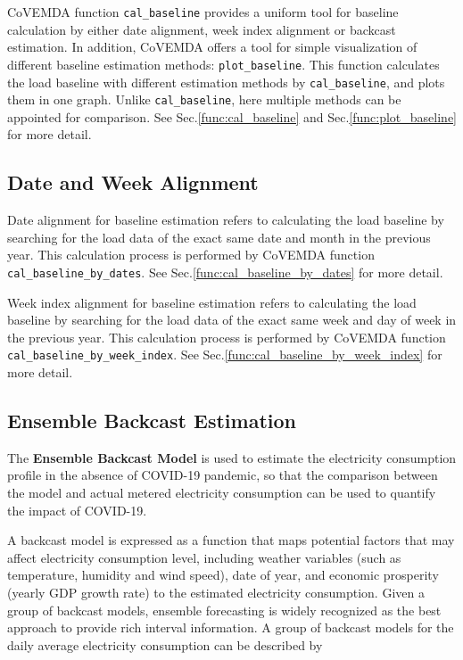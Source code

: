 \documentclass[10pt]{article}
\newcommand{\covemda}{CoVEMDA}
\numberwithin{equation}{section}
\numberwithin{table}{section}
\numberwithin{figure}{section}
\begin{document}
\covemda{} function \verb!cal_baseline! provides a uniform tool for baseline calculation by either date alignment, week index alignment or backcast estimation. In addition, \covemda{} offers a tool for simple visualization of different baseline estimation methods: \verb!plot_baseline!. This function calculates the load baseline with different estimation methods by \verb!cal_baseline!, and plots them in one graph. Unlike \verb!cal_baseline!, here multiple methods can be appointed for comparison. See Sec.\ref{func:cal_baseline} and Sec.\ref{func:plot_baseline} for more detail.



\subsection{Date and Week Alignment}

Date alignment for baseline estimation refers to calculating the load baseline by searching for the load data of the exact same date and month in the previous year. This calculation process is performed by \covemda{} function \verb!cal_baseline_by_dates!. See Sec.\ref{func:cal_baseline_by_dates} for more detail.

Week index alignment for baseline estimation refers to calculating the load baseline by searching for the load data of the exact same week and day of week in the previous year. This calculation process is performed by \covemda{} function \verb!cal_baseline_by_week_index!. See Sec.\ref{func:cal_baseline_by_week_index} for more detail.



\subsection{Ensemble Backcast Estimation}
The \textbf{Ensemble Backcast Model} is used to estimate the electricity consumption profile in the absence of COVID-19 pandemic, so that the comparison between the model and actual metered electricity consumption can be used to quantify the impact of COVID-19.

A backcast model is expressed as a function that maps potential factors that may affect electricity consumption level, including weather variables (such as temperature, humidity and wind speed), date of year, and economic prosperity (yearly GDP growth rate) to the estimated electricity consumption. Given a group of backcast models, ensemble forecasting is widely recognized as the best approach to provide rich interval information. A group of backcast models for the daily average electricity consumption can be described by
\end{document}
